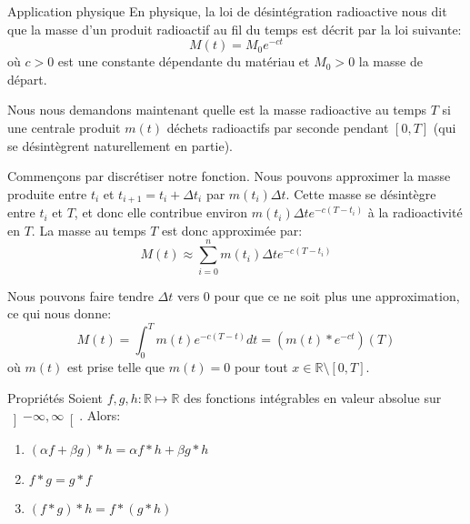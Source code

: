 \documentclass[a4paper]{article}
\begin{document}
\begin{parag}{Application physique}
    En physique, la loi de désintégration radioactive nous dit que la masse d'un produit radioactif au fil du temps est décrit par la loi suivante: 
    \[M\left(t\right) = M_0 e^{-c t}\]
    où $c > 0$ est une constante dépendante du matériau et $M_0 > 0$ la masse de départ.

    Nous nous demandons maintenant quelle est la masse radioactive au temps $T$ si une centrale produit $m\left(t\right)$ déchets radioactifs par seconde pendant $\left[0, T\right]$ (qui se désintègrent naturellement en partie).

    Commençons par discrétiser notre fonction. Nous pouvons approximer la masse produite entre $t_i$ et $t_{i+1} = t_i + \Delta t_i$ par $m\left(t_i\right) \Delta t$. Cette masse se désintègre entre $t_i$ et $T$, et donc elle contribue environ $m\left(t_i\right) \Delta t e^{-c \left(T - t_i\right)}$ à la radioactivité en $T$. La masse au temps $T$ est donc approximée par: 
    \[M\left(t\right) \approx \sum_{i=0}^{n} m\left(t_i\right) \Delta t e^{-c \left(T - t_i\right)}\]
    
    Nous pouvons faire tendre $\Delta t$ vers 0 pour que ce ne soit plus une approximation, ce qui nous donne: 
    \[M\left(t\right) = \int_{0}^{T} m\left(t\right)e^{-c\left(T - t\right)} dt = \left(m\left(t\right) * e^{-ct}\right)\left(T\right)\]
    où $m\left(t\right)$ est prise telle que $m\left(t\right) = 0$ pour tout $x \in \mathbb{R} \setminus \left[0, T\right]$.
\end{parag}

\begin{parag}{Propriétés}
    Soient $f, g, h : \mathbb{R} \mapsto \mathbb{R}$ des fonctions intégrables en valeur absolue sur $\left]-\infty, \infty\right[ $. Alors:
    \begin{enumerate}
        \item $\left(\alpha f + \beta g\right) * h = \alpha f * h + \beta g * h$
        \item $f * g = g * f$
        \item $\left(f * g\right) * h = f * \left(g * h\right)$
    \end{enumerate}
\end{parag}
\end{document}
